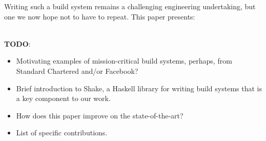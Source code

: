 Writing such a build system remains a challenging engineering undertaking, but one we now hope not to have to repeat.
This paper presents:

~\\
\textbf{TODO}:
\begin{itemize}
  \item Motivating examples of mission-critical build systems, perhaps, from
  Standard Chartered and/or Facebook?
  \item Brief introduction to Shake, a Haskell library for writing build systems
  that is a key component to our work.
  \item How does this paper improve on the state-of-the-art?
  \item List of specific contributions.
\end{itemize}
